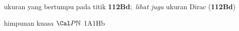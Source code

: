 














ukuran yang bertumpu pada titik {\bf 112Bd};\ 
  {\it lihat juga} ukuran Dirac ({\bf 112Bd})








































































{himpunan kuasa $\Cal P\Bbb N$ }
1A1Hb
























